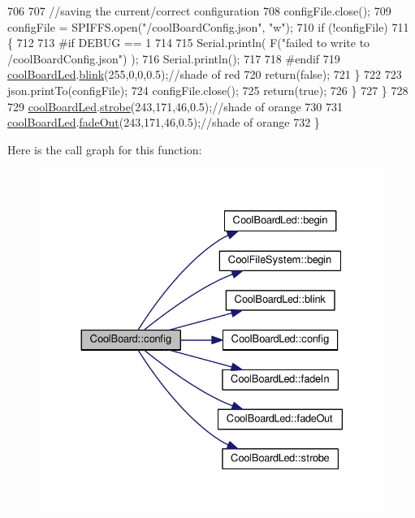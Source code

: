 \begin{DoxyCode}
706 
707             \textcolor{comment}{//saving the current/correct configuration}
708             configFile.close();
709             configFile = SPIFFS.open(\textcolor{stringliteral}{"/coolBoardConfig.json"}, \textcolor{stringliteral}{"w"});
710             \textcolor{keywordflow}{if} (!configFile)
711             \{
712             
713 \textcolor{preprocessor}{            #if DEBUG == 1}
714 
715                 Serial.println( F(\textcolor{stringliteral}{"failed to write to /coolBoardConfig.json"}) );
716                 Serial.println();
717             
718 \textcolor{preprocessor}{            #endif}
719                 \hyperlink{classCoolBoard_a1b1d3c684a5baa56b08486e192fd8e97}{coolBoardLed}.\hyperlink{classCoolBoardLed_a96e1ea13003eee34c9dbcef340404426}{blink}(255,0,0,0.5);\textcolor{comment}{//shade of red     }
720                 \textcolor{keywordflow}{return}(\textcolor{keyword}{false});
721             \}
722 
723             json.printTo(configFile);
724             configFile.close();
725             \textcolor{keywordflow}{return}(\textcolor{keyword}{true});
726         \}
727     \}
728 
729     \hyperlink{classCoolBoard_a1b1d3c684a5baa56b08486e192fd8e97}{coolBoardLed}.\hyperlink{classCoolBoardLed_ad5f0de4c628cbfbf49896042831c64ad}{strobe}(243,171,46,0.5);\textcolor{comment}{//shade of orange}
730     
731     \hyperlink{classCoolBoard_a1b1d3c684a5baa56b08486e192fd8e97}{coolBoardLed}.\hyperlink{classCoolBoardLed_a93d545679237e8cc858324367149775c}{fadeOut}(243,171,46,0.5);\textcolor{comment}{//shade of orange               }
732 \}
\end{DoxyCode}
Here is the call graph for this function\+:
\nopagebreak
\begin{figure}[H]
\begin{center}
\leavevmode
\includegraphics[width=330pt]{classCoolBoard_a583a874c09c07e70a6eb9229fc4beddb_cgraph}
\end{center}
\end{figure}
\mbox{\label{classCoolBoard_a519de78b807f8ec6463ff484eb925918}} 
